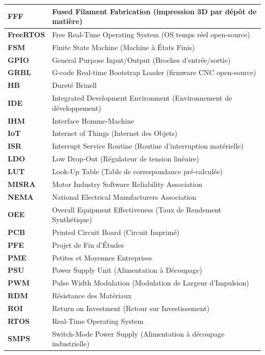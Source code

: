 \begin{longtable}{|l|p{10.5cm}|}
\hline
\textbf{FFF} & Fused Filament Fabrication (impression 3D par dépôt de matière) \\
\hline
\textbf{FreeRTOS} & Free Real-Time Operating System (OS temps réel open-source) \\
\hline
\textbf{FSM} & Finite State Machine (Machine à États Finis) \\
\hline
\textbf{GPIO} & General Purpose Input/Output (Broches d'entrée/sortie) \\
\hline
\textbf{GRBL} & G-code Real-time Bootstrap Loader (firmware CNC open-source) \\
\hline
\textbf{HB} & Dureté Brinell \\
\hline
\textbf{IDE} & Integrated Development Environment (Environnement de développement) \\
\hline
\textbf{IHM} & Interface Homme-Machine \\
\hline
\textbf{IoT} & Internet of Things (Internet des Objets) \\
\hline
\textbf{ISR} & Interrupt Service Routine (Routine d'interruption matérielle) \\
\hline
\textbf{LDO} & Low Drop-Out (Régulateur de tension linéaire) \\
\hline
\textbf{LUT} & Look-Up Table (Table de correspondance pré-calculée) \\
\hline
\textbf{MISRA} & Motor Industry Software Reliability Association \\
\hline
\textbf{NEMA} & National Electrical Manufacturers Association \\
\hline
\textbf{OEE} & Overall Equipment Effectiveness (Taux de Rendement Synthétique) \\
\hline
\textbf{PCB} & Printed Circuit Board (Circuit Imprimé) \\
\hline
\textbf{PFE} & Projet de Fin d'Études \\
\hline
\textbf{PME} & Petites et Moyennes Entreprises \\
\hline
\textbf{PSU} & Power Supply Unit (Alimentation à Découpage) \\
\hline
\textbf{PWM} & Pulse Width Modulation (Modulation de Largeur d'Impulsion) \\
\hline
\textbf{RDM} & Résistance des Matériaux \\
\hline
\textbf{ROI} & Return on Investment (Retour sur Investissement) \\
\hline
\textbf{RTOS} & Real-Time Operating System \\
\hline
\textbf{SMPS} & Switch-Mode Power Supply (Alimentation à découpage industrielle) \\

\end{longtable}
